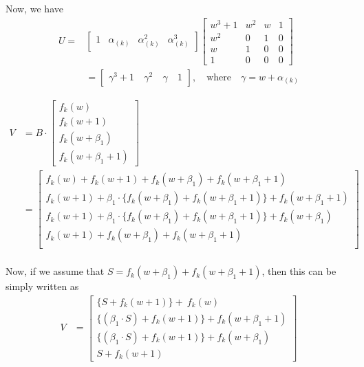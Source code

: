 \documentclass[11pt,runningheads]{llncs}
\begin{document}
Now, we have
\begin{equation*}
    \begin{aligned}
        U= &
        \begin{bmatrix}
            1 & \alpha_{(k)} & \alpha_{(k)}^2 & \alpha_{(k)}^3
        \end{bmatrix}
        \begin{bmatrix} 
            w^3+1 & w^2 & w & 1 \\
            w^2 & 0 & 1 & 0 \\ 
            w & 1 & 0 & 0 \\ 
            1 & 0 & 0 & 0 
        \end{bmatrix}\\
        &=
        \begin{bmatrix}
            \gamma^3+1 &~ \gamma^2 &~ \gamma &~ 1
        \end{bmatrix}, \quad \text{where} \quad \gamma=w+\alpha_{(k)}
    \end{aligned}
\end{equation*}

\begin{equation*}
    \begin{aligned}
       V &=
       B \cdot
       \begin{bmatrix}
            f_k(w)\\
            f_k(w+1)\\
            f_k(w+\beta_1)\\
            f_k(w+\beta_1+1)
        \end{bmatrix}\\
       &=
       \begin{bmatrix}
           f_k(w)+ f_k(w+1)+ f_k(w+\beta_1)+ f_k(w+\beta_1+1)\\
           f_k(w+1)+ \beta_1 \cdot \{f_k(w+\beta_1)+ f_k(w+\beta_1+1) \} + f_k(w+\beta_1+1)\\
           f_k(w+1)+ \beta_1 \cdot \{f_k(w+\beta_1)+ f_k(w+\beta_1+1) \} + f_k(w+\beta_1)\\
           f_k(w+1)+  f_k(w+\beta_1)+ f_k(w+\beta_1+1)\\
       \end{bmatrix}\\
    \end{aligned}
\end{equation*}

Now, if we assume that $S= f_k(w+\beta_1)+ f_k(w+\beta_1+1)$, then this can be simply written as
\begin{equation*}
    \begin{aligned}
        V &=
        \begin{bmatrix}
            \big\{S+ f_k(w+1) \big\}+~ f_k(w)\\
            \big\{(\beta_1 \cdot S) + f_k(w+1) \big\} + f_k(w+\beta_1+1)\\
           \big\{(\beta_1 \cdot S) + f_k(w+1)  \big\}+ f_k(w+\beta_1)\\
            S+ f_k(w+1)
        \end{bmatrix}
    \end{aligned}
\end{equation*}
\end{document}
